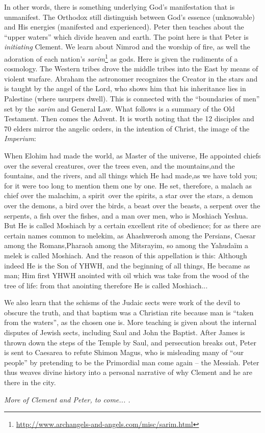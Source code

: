 In other words, there is something underlying God's manifestation that is unmanifest. The Orthodox still distinguish between God's essence (unknowable) and His energies (manifested and experienced). Peter then teaches about the ``upper waters'' which divide heaven and earth. The point here is that Peter is \emph{initiating} Clement. We learn about Nimrod and the worship of fire, as well the adoration of each nation's \emph{sarim}\footnote{\url{http://www.archangels-and-angels.com/misc/sarim.html}} as gods. Here is given the rudiments of a cosmology. The Western tribes drove the middle tribes into the East by means of violent warfare. Abraham the astronomer recognizes the Creator in the stars and is taught by the angel of the Lord, who shows him that his inheritance lies in Palestine (where usurpers dwell). This is connected with the ``boundaries of men'' set by the \emph{sarim} and General Law. What follows is a summary of the Old Testament. Then comes the Advent. It is worth noting that the 12 disciples and 70 elders mirror the angelic orders, in the intention of Christ, the image of the \emph{Imperium}:

\begin{quotex}
When Elohim had made the world, as Master of the universe, He appointed chiefs over the several creatures, over the trees even, and the mountains,and the fountains, and the rivers, and all things which He had made,as we have told you; for it were too long to mention them one by one. He set, therefore, a malach as chief over the malachim, a spirit~over the spirits, a star over the stars, a demon over the demons, a bird over the birds, a beast over the beasts, a serpent over the serpents, a fish over the fishes, and a man over men, who is Moshiach Yeshua. But He is called Moshiach by a certain excellent rite of obedience; for as there are certain names common to melekim, as Ahashwerosh among the Persians, Caesar among the Romans,Pharaoh among the Mitsrayim, so among the Yahudaïm a melek is called Moshiach. And the reason of this appellation is this: Although indeed He is the Son of YHWH, and the beginning of all things, He became as man; Him first YHWH anointed with oil which was take from the wood of the tree of life: from that anointing therefore He is called Moshiach... \end{quotex}


We also learn that the schisms of the Judaic sects were work of the devil to obscure the truth, and that baptism was a Christian rite because man is ``taken from the waters'', as the chosen one is. More teaching is given about the internal disputes of Jewish sects, including Saul and John the Baptist. After James is thrown down the steps of the Temple by Saul, and persecution breaks out, Peter is sent to Caesarea to refute Shimon Magus, who is misleading many of ``our people'' by pretending to be the Primordial man come again -- the Messiah. Peter thus weaves divine history into a personal narrative of why Clement and he are there in the city.

\emph{More of Clement and Peter, to come... .}




